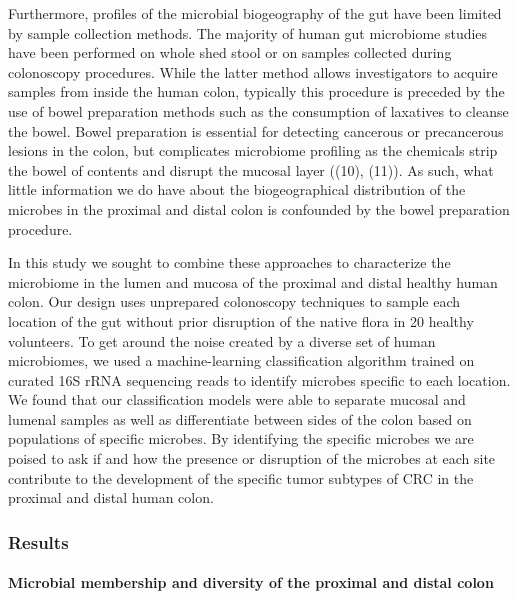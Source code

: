 \documentclass[11pt,]{article}
\let\oldparagraph\paragraph
\renewcommand{\paragraph}[1]{\oldparagraph{#1}\mbox{}}
\begin{document}
Furthermore, profiles of the microbial biogeography of the gut have been
limited by sample collection methods. The majority of human gut
microbiome studies have been performed on whole shed stool or on samples
collected during colonoscopy procedures. While the latter method allows
investigators to acquire samples from inside the human colon, typically
this procedure is preceded by the use of bowel preparation methods such
as the consumption of laxatives to cleanse the bowel. Bowel preparation
is essential for detecting cancerous or precancerous lesions in the
colon, but complicates microbiome profiling as the chemicals strip the
bowel of contents and disrupt the mucosal layer ((10), (11)). As such,
what little information we do have about the biogeographical
distribution of the microbes in the proximal and distal colon is
confounded by the bowel preparation procedure.

In this study we sought to combine these approaches to characterize the
microbiome in the lumen and mucosa of the proximal and distal healthy
human colon. Our design uses unprepared colonoscopy techniques to sample
each location of the gut without prior disruption of the native flora in
20 healthy volunteers. To get around the noise created by a diverse set
of human microbiomes, we used a machine-learning classification
algorithm trained on curated 16S rRNA sequencing reads to identify
microbes specific to each location. We found that our classification
models were able to separate mucosal and lumenal samples as well as
differentiate between sides of the colon based on populations of
specific microbes. By identifying the specific microbes we are poised to
ask if and how the presence or disruption of the microbes at each site
contribute to the development of the specific tumor subtypes of CRC in
the proximal and distal human colon.

\subsubsection{Results}\label{results}

\paragraph{Microbial membership and diversity of the proximal and distal
colon}\label{microbial-membership-and-diversity-of-the-proximal-and-distal-colon}
\end{document}
